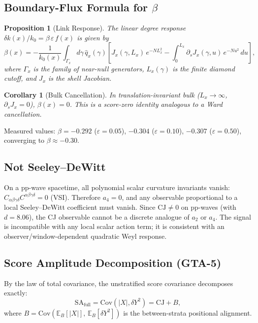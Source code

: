 \documentclass[12pt,a4paper]{article}
\newtheorem{proposition}{Proposition}
\newtheorem{corollary}{Corollary}
\begin{document}
\subsection{Boundary-Flux Formula for $\beta$}

\begin{proposition}[Link Response]\label{prop:beta}
The linear degree response $\delta k(x)/k_0 = \beta\,\varepsilon\,f(x)$ is given by
\begin{equation}\label{eq:beta}
  \beta(x) = -\frac{1}{k_0(x)} \int_{\Gamma_x} d\gamma\,\hat{q}_x(\gamma)
  \left[J_x(\gamma,L_x)\,e^{-NL_x^2}
  - \int_0^{L_x} \partial_s J_x(\gamma,u)\,e^{-Nu^2}\,du\right],
\end{equation}
where $\Gamma_x$ is the family of near-null generators, $L_x(\gamma)$ is the finite diamond cutoff, and $J_x$ is the shell Jacobian.
\end{proposition}

\begin{corollary}[Bulk Cancellation]
In translation-invariant bulk ($L_x \to \infty$, $\partial_s J_x = 0$), $\beta(x) = 0$. This is a score-zero identity analogous to a Ward cancellation.
\end{corollary}

\noindent Measured values: $\beta = -0.292$ ($\varepsilon = 0.05$), $-0.304$ ($\varepsilon = 0.10$), $-0.307$ ($\varepsilon = 0.50$), converging to $\beta \approx -0.30$.

\subsection{Not Seeley--DeWitt}

On a pp-wave spacetime, all polynomial scalar curvature invariants vanish: $C_{\alpha\beta\gamma\delta}C^{\alpha\beta\gamma\delta} = 0$ (VSI). Therefore $a_4 = 0$, and any observable proportional to a local Seeley--DeWitt coefficient must vanish. Since $\mathrm{CJ} \neq 0$ on pp-waves (with $d = 8.06$), the CJ observable cannot be a discrete analogue of $a_2$ or $a_4$. The signal is incompatible with any local scalar action term; it is consistent with an observer/window-dependent quadratic Weyl response.

\subsection{Score Amplitude Decomposition (GTA-5)}

By the law of total covariance, the unstratified score covariance decomposes exactly:
\begin{equation}
  \mathrm{SA}_{\mathrm{full}} = \mathrm{Cov}(|X|, \delta Y^2) = \mathrm{CJ} + B,
\end{equation}
where $B = \mathrm{Cov}(\mathbb{E}_B[|X|],\, \mathbb{E}_B[\delta Y^2])$ is the between-strata positional alignment.
\end{document}
